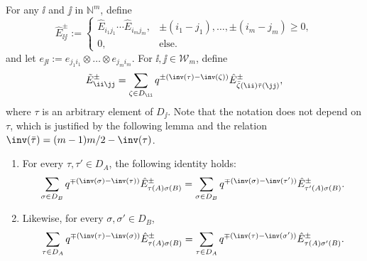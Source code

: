 For any $ \ii $ and $ \jj $ in $ \mathbb{N}^m $, define
\[
\hat{E}^{\pm}_{\ii \jj} :=
\begin{cases}
\hat{E}_{i_1j_1}\cdots \hat{E}_{i_mj_m}, & \pm(i_1-j_1),\dots,\pm(i_m-j_m)\geq 0,\\
0, & \text{else}.
\end{cases}
\]
 and let $ e_{ \jj \ii }:= e_{j_1i_1} \otimes \dots \otimes e_{j_mi_m}$. For $\ii, \jj \in \mathcal{W}_m$, define
\[
\tilde{E}^{\pm}_{\ii\jj} =
\sum_{\zeta \in D_{\ii}}q^{\pm(\inv(\tau) -\inv(\zeta))}\hat{E}^{\pm}_{\bar{\zeta}(\ii)\bar{\tau}(\jj)},
\]
where $\tau$ is an arbitrary element of $D_{\jj}$. Note that the notation does not depend on $\tau$, which is justified by the following lemma and the relation $\inv(\bar{\tau}) = (m-1)m/2 - \inv(\tau)$.

\begin{Lemma} \label{prop 1}\quad
	\begin{enumerate}\itemsep=0pt
		\item[$1.$] For every $\tau,\tau' \in D_A$, the following identity holds: \begin{equation*}%
		\sum_{\sigma\in D_B} q^{\mp (\inv(\sigma)-\inv(\tau))} \hat{E}^{\pm}_{\tau(A) \sigma (B)} = \sum_{\sigma\in D_B} q^{\mp (\inv(\sigma)-\inv(\tau'))} \hat{E}^{\pm}_{\tau'(A) \sigma (B)} .
		\end{equation*} 	 	
		\item[$2.$] Likewise, for every $\sigma,\sigma' \in D_B$, \begin{equation*}%
		\sum_{\tau\in D_A} q^{\mp (\inv(\tau)-\inv(\sigma))} \hat{E}^{\pm}_{\tau(A) \sigma (B)} = \sum_{\tau\in D_A} q^{\mp (\inv(\tau)-\inv(\sigma'))} \hat{E}^{\pm}_{\tau(A) \sigma' (B)} .
		\end{equation*} 	 	
	\end{enumerate}
	\end{Lemma}
